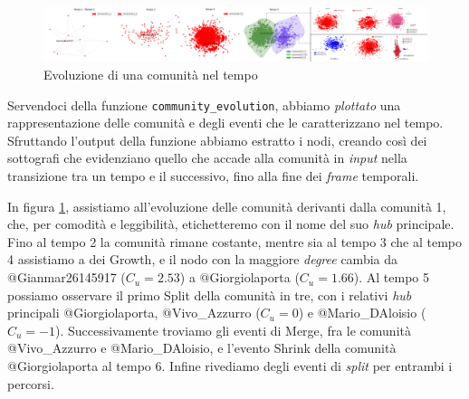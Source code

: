     \begin{figure}
        \centering
        \includegraphics[width=15cm] {4_Community_discovery/evolution.png}
        \caption{Evoluzione di una comunità nel tempo}
        \label{example_community_events}
    \end{figure}
    
    Servendoci della funzione \texttt{community\_evolution}, abbiamo \textit{plottato} una rappresentazione delle comunità e degli eventi che le caratterizzano nel tempo. Sfruttando l’output della funzione abbiamo estratto i nodi, creando così dei sottografi che evidenziano quello che accade alla comunità in \textit{input} nella transizione tra un tempo e il successivo, fino alla fine dei \textit{frame} temporali. 
    
   In figura \ref{example_community_events}, assistiamo all'evoluzione delle comunità derivanti dalla comunità 1, che, per comodità e leggibilità, etichetteremo con il nome del suo \textit{hub} principale. Fino al tempo 2 la comunità rimane costante, mentre sia al tempo 3 che al tempo 4 assistiamo a dei Growth, e il nodo con la maggiore \textit{degree} cambia da @Gianmar26145917 ($C_{u} = 2.53$) a @Giorgiolaporta ($C_{u} =  1.66$). Al tempo 5 possiamo osservare il primo Split della comunità in tre, con i relativi \textit{hub} principali  @Giorgiolaporta, @Vivo\_Azzurro ($C_{u} = 0$) e @Mario\_DAloisio ($C_{u} = -1$).
   Successivamente troviamo gli eventi di Merge, fra le comunità @Vivo\_Azzurro e @Mario\_DAloisio, e l'evento Shrink della comunità @Giorgiolaporta al tempo 6. Infine rivediamo degli eventi di \textit{split} per entrambi i percorsi.
   
